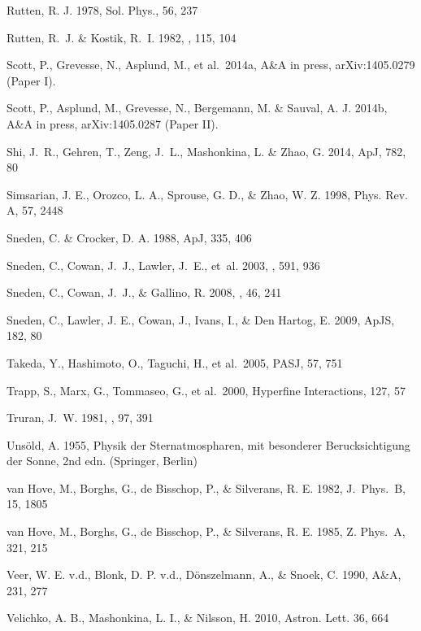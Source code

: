 \documentclass[traditabstract]{aa}
\begin{document}
\begin{thebibliography}{}
  Rutten, R. J. 1978, Sol. Phys., 56, 237

  {Rutten}, R.~J. \& {Kostik}, R.~I. 1982, \aap, 115, 104

  Scott, P., Grevesse, N., Asplund, M., et al.\ 2014a, A\&A in press, arXiv:1405.0279 (Paper I).

  Scott, P., Asplund, M., Grevesse, N., Bergemann, M. \& Sauval, A. J. 2014b, A\&A in press, arXiv:1405.0287 (Paper II).

  {Shi}, J.~R., {Gehren}, T., {Zeng}, J.~L., {Mashonkina}, L. \& {Zhao}, G. 2014, ApJ, 782, 80

  Simsarian, J. E., Orozco, L. A., Sprouse, G. D., \& Zhao, W. Z. 1998, Phys. Rev. A, 57, 2448

  Sneden, C. \& Crocker, D. A. 1988, ApJ, 335, 406

  {Sneden}, C., {Cowan}, J.~J., {Lawler}, J.~E., {et~al.} 2003, \apj, 591, 936

  {Sneden}, C., {Cowan}, J.~J., \& {Gallino}, R. 2008, \araa, 46, 241

  Sneden, C., Lawler, J. E., Cowan, J., Ivans, I., \& Den Hartog, E. 2009, ApJS, 182, 80

  Takeda, Y., Hashimoto, O., Taguchi, H., et al.\ 2005, PASJ, 57, 751

  Trapp, S., Marx, G., Tommaseo, G., et al.\ 2000, Hyperfine Interactions, 127, 57

  {Truran}, J.~W. 1981, \aap, 97, 391

  Uns\"old, A. 1955, Physik der Sternatmospharen, mit besonderer Berucksichtigung der Sonne, 2nd edn. (Springer, Berlin)

  van Hove, M., Borghs, G., de Bisschop, P., \& Silverans, R. E. 1982, J.\ Phys.\ B, 15, 1805

  van Hove, M., Borghs, G., de Bisschop, P., \& Silverans, R. E. 1985, Z. Phys.\ A, 321, 215

  Veer, W. E. v.d., Blonk, D. P. v.d., D\"onszelmann, A., \& Snoek, C. 1990, A\&A, 231, 277

  Velichko, A. B., Mashonkina, L. I., \& Nilsson, H. 2010, Astron. Lett. 36, 664


\end{thebibliography}
\end{document}
